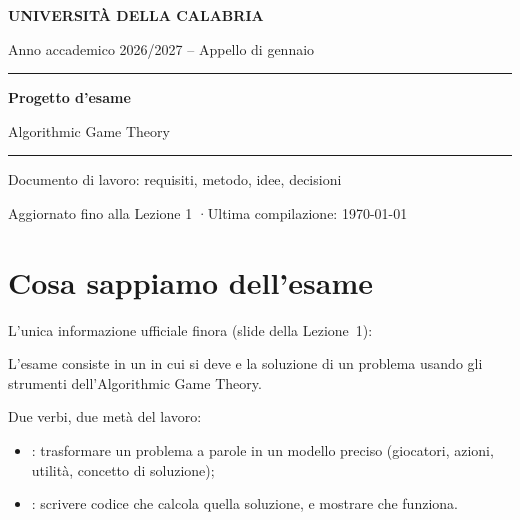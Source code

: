 \documentclass[11pt, a4paper, oneside, openany]{book}
\begin{document}
\frontmatter

\hypersetup{pageanchor=false}
\begin{titlepage}
  \centering
  \vspace*{3cm}
  {\sffamily\bfseries\color{unical}\large UNIVERSITÀ DELLA CALABRIA\par}
  \vspace{0.3cm}
  {\sffamily\color{grigio}Anno accademico 2026/2027 -- Appello di gennaio\par}
  \vspace{2.5cm}
  {\color{blu}\rule{\linewidth}{1.2pt}\par}
  \vspace{0.6cm}
  {\sffamily\bfseries\Huge\color{blu} Progetto d'esame\par}
  \vspace{0.4cm}
  {\sffamily\Large Algorithmic Game Theory\par}
  \vspace{0.6cm}
  {\color{blu}\rule{\linewidth}{1.2pt}\par}
  \vspace{1.5cm}
  {\large Documento di lavoro: requisiti, metodo, idee, decisioni\par}
  \vfill
  {\small\color{grigio} Aggiornato fino alla Lezione 1 \quad·\quad Ultima compilazione: \today\par}
\end{titlepage}
\hypersetup{pageanchor=true}

\tableofcontents

\mainmatter
\chapter{Cosa sappiamo dell'esame}

L'unica informazione ufficiale finora (slide della Lezione~1):

\begin{definizione}[Esame]
L'esame consiste in un  in cui si deve  e 
la soluzione di un problema usando gli strumenti dell'Algorithmic Game Theory.
\end{definizione}

Due verbi, due metà del lavoro:
\begin{itemize}
  \item {}: trasformare un problema a parole in un modello preciso
        (giocatori, azioni, utilità, concetto di soluzione);
  \item {}: scrivere codice che calcola quella soluzione, e mostrare che funziona.
\end{itemize}
\end{document}

